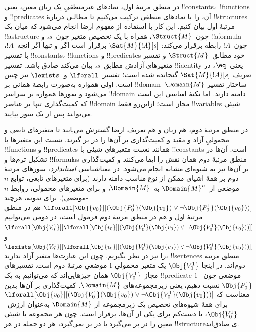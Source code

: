 \documentclass[../../../include/open-logic-section]{subfiles}
\begin{document}


در منطق مرتبهٔ اول، نمادهای غیرمنطقیِ یک زبان معین، یعنی
!!{constant}s، !!{function}s و !!{predicate}s آن، را با نمادهای منطقی
ترکیب می‌کنیم تا مطالبی دربارهٔ !!{structure}s مرتبهٔ اول بیان کنیم.
این کار با استفاده از مفهوم ارضا انجام می‌شود که میان یک
!!a{structure} چون~$\Struct{M}$، همراه با یک تخصیص متغیر چون~$s$، و
!!a{formula} چون~$!A$ رابطه برقرار می‌کند: $\Sat{M}{!A}[s]$ برقرار
است اگر و تنها اگر آنچه~$!A$، با تفسیر !!{constant}s، !!{function}s و
!!{predicate}s خود مطابق~$\Struct{M}$ و تفسیر متغیرهای آزادش مطابق~$s$،
بیان می‌کند صادق باشد. تفسیر !!{identity} یعنی~$\eq$، در تعریف
$\Sat{M}{!A}[s]$ گنجانده شده است؛ تفسیر~$\lforall$ و~$\lexists$ نیز چنین است.
اولی همواره به‌صورت رابطهٔ همانی بر !!{domain}~$\Domain{M}$ ساختار
تفسیر می‌شود و سورها همواره بر سراسر !!{domain} دامنه دارند. اما نکتهٔ
اساسی این است که کمیت‌گذاری تنها بر عناصر !!{domain} مجاز است؛ ازاین‌رو
فقط !!{variable}s شیئی می‌توانند پس از یک سور بیایند.

در منطق مرتبهٔ دوم، هم زبان و هم تعریف ارضا گسترش می‌یابند تا متغیرهای
تابعی و محمولیِ آزاد و مقید و کمیت‌گذاری بر آن‌ها را در بر گیرند. نسبت
این متغیرها با !!{function}s و !!{predicate}s همانند نسبت متغیرهای شیئی
با !!{constant}s است. آن‌ها در تشکیل ترم‌ها و !!{formula}s منطق مرتبهٔ
دوم همان نقش را ایفا می‌کنند و کمیت‌گذاری بر آن‌ها نیز به شیوه‌ای مشابه
انجام می‌شود. در معناشناسی \emph{استاندارد}، سورهای مرتبهٔ دوم بر همهٔ
اشیای ممکن از نوع مناسب دامنه دارند (برای متغیرهای تابعی، توابع
$n$-موضعی از~$\Domain{M}^n$ به~$\Domain{M}$، و برای متغیرهای محمولی،
روابط $n$-موضعی). برای نمونه، هرچند
$\lforall[\Obj{v_0}][(\Obj{P^1_0}(\Obj{v_0}) \lor \lnot
  \Obj{P^1_0}(\Obj{v_0}))]$ هم در منطق مرتبهٔ اول و هم در منطق مرتبهٔ
دوم فرمول است، در دومی می‌توانیم
$\lforall[\Obj{V^1_0}][\lforall[\Obj{v_0}][(\Obj{V^1_0}(\Obj{v_0}) \lor
    \lnot \Obj{V^1_0}(\Obj{v_0}))]]$ و
$\lexists[\Obj{V^1_0}][\lforall[\Obj{v_0}][(\Obj{V^1_0}(\Obj{v_0}) \lor
    \lnot \Obj{V^1_0}(\Obj{v_0}))]]$ را نیز در نظر بگیریم. چون این
عبارت‌ها متغیر آزاد ندارند، !!{sentence}s منطق مرتبهٔ دوم‌اند. در اینجا
$\Obj{V^1_0}$ یک متغیر محمولیِ $1$-موضعیِ مرتبهٔ دوم است. تفسیرهای
مجاز~$\Obj{V^1_0}$ همان چیزهایی‌اند که می‌توانیم به یک !!{predicate}
$1$-موضعی چون~$\Obj{P^1_0}$ نسبت دهیم، یعنی زیرمجموعه‌های
$\Domain{M}$. کمیت‌گذاری بر آن‌ها بدین معناست که
$\lforall[\Obj{v_0}][(\Obj{V^1_0}(\Obj{v_0}) \lor \lnot
  \Obj{V^1_0}(\Obj{v_0}))]$ برای همهٔ شیوه‌های تخصیص یک زیرمجموعه از
$\Domain{M}$ به‌عنوان ارزش~$\Obj{V^1_0}$، یا دست‌کم برای یکی از آن‌ها،
برقرار است. چون هر مجموعه یا شیئی معین را در بر می‌گیرد یا در بر
نمی‌گیرد، هر دو جمله در هر !!{structure}ی صادق‌اند.
\end{document}
